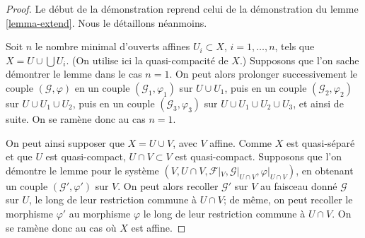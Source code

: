 \begin{proof}
Le début de la démonstration reprend celui de la
démonstration du lemme \ref{lemma-extend}. Nous le détaillons néanmoins.

\medskip\noindent
Soit $n$ le nombre minimal d'ouverts affines $U_i \subset X$,
$i = 1, \ldots, n$, tels que $X = U \cup \bigcup U_i$.
(On utilise ici la quasi-compacité de $X$.) Supposons que l'on
sache démontrer le lemme dans le cas $n = 1$. On peut alors prolonger
successivement le couple $(\mathcal{G}, \varphi)$
en un couple $(\mathcal{G}_1, \varphi_1)$ sur $U \cup U_1$,
puis en un couple $(\mathcal{G}_2, \varphi_2)$ sur $U \cup U_1 \cup U_2$,
puis en un couple $(\mathcal{G}_3, \varphi_3)$ sur $U \cup U_1 \cup U_2 \cup U_3$,
et ainsi de
suite. On se ramène donc au cas $n = 1$.

\medskip\noindent
On peut ainsi supposer que $X = U \cup V$, avec $V$ affine.
Comme $X$ est quasi-séparé et que $U$ est
quasi-compact, $U \cap V \subset V$ est quasi-compact.
Supposons que l'on démontre le lemme pour le système
$(V, U \cap V, \mathcal{F}|_V, \mathcal{G}|_{U \cap V}, \varphi|_{U \cap V})$,
en obtenant un couple $(\mathcal{G}', \varphi')$ sur $V$.
On peut alors recoller $\mathcal{G}'$ sur $V$ au faisceau donné $\mathcal{G}$
sur $U$, le long de leur restriction commune à $U \cap V$; de même, on peut recoller le
morphisme $\varphi'$ au morphisme $\varphi$ le long de leur restriction commune à
$U \cap V$. On se ramène donc au cas où $X$ est affine.


\end{proof}
